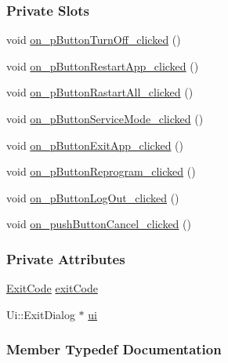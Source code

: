 \subsubsection*{Private Slots}
\begin{DoxyCompactItemize}
\item 
void \mbox{\hyperlink{classExitDialog_a007aae536da00aa771afecec4222d54e}{on\+\_\+p\+Button\+Turn\+Off\+\_\+clicked}} ()
\item 
void \mbox{\hyperlink{classExitDialog_a113e0571b5d73536f9d2c339963959f3}{on\+\_\+p\+Button\+Restart\+App\+\_\+clicked}} ()
\item 
void \mbox{\hyperlink{classExitDialog_a6c464f98d852bc55a7c088b7e3da9d07}{on\+\_\+p\+Button\+Rastart\+All\+\_\+clicked}} ()
\item 
void \mbox{\hyperlink{classExitDialog_a19cd3597771722ecdca6ce177c3d5406}{on\+\_\+p\+Button\+Service\+Mode\+\_\+clicked}} ()
\item 
void \mbox{\hyperlink{classExitDialog_a57bfa16aefc0c094bb04f2fa5a1882c6}{on\+\_\+p\+Button\+Exit\+App\+\_\+clicked}} ()
\item 
void \mbox{\hyperlink{classExitDialog_ab63b993dd9bc432cf549dd854050aa75}{on\+\_\+p\+Button\+Reprogram\+\_\+clicked}} ()
\item 
void \mbox{\hyperlink{classExitDialog_a8032c8cae9a0c12dd976fa30426bb629}{on\+\_\+p\+Button\+Log\+Out\+\_\+clicked}} ()
\item 
void \mbox{\hyperlink{classExitDialog_ad869a166c6bc6746f49b7ad311d7023a}{on\+\_\+push\+Button\+Cancel\+\_\+clicked}} ()
\end{DoxyCompactItemize}
\subsubsection*{Private Attributes}
\begin{DoxyCompactItemize}
\item 
\mbox{\hyperlink{classExitDialog_a750dfbbef3dec32bec821122ee7b910c}{Exit\+Code}} \mbox{\hyperlink{classExitDialog_adff4059e3ad467576437361b8f8518c0}{exit\+Code}}
\item 
Ui\+::\+Exit\+Dialog $\ast$ \mbox{\hyperlink{classExitDialog_a2d2914db33580192188032e15348594e}{ui}}
\end{DoxyCompactItemize}


\subsubsection{Member Typedef Documentation} \mbox{\label{classExitDialog_a750dfbbef3dec32bec821122ee7b910c}}   
